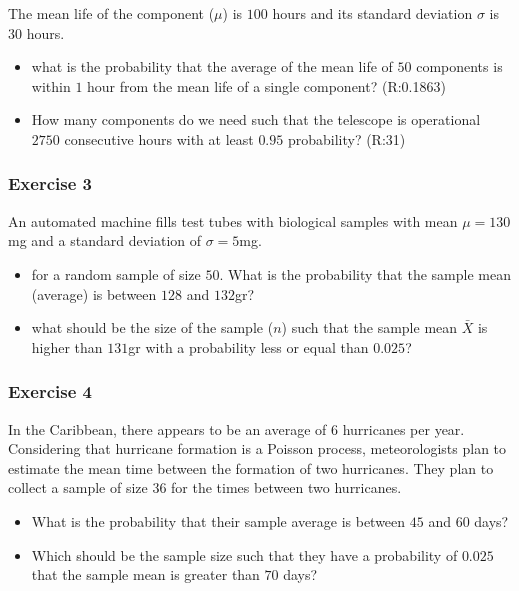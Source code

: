 \documentclass[
]{book}
\begin{document}
The mean life of the component (\(\mu\)) is \(100\) hours and its standard deviation \(\sigma\) is \(30\) hours.

\begin{itemize}
\item
  what is the probability that the average of the mean life of \(50\) components is within \(1\) hour from the mean life of a single component? (R:0.1863)
\item
  How many components do we need such that the telescope is operational \(2750\) consecutive hours with at least \(0.95\) probability? (R:31)
\end{itemize}

\hypertarget{exercise-3-3}{%
\subsubsection{Exercise 3}\label{exercise-3-3}}

An automated machine fills test tubes with biological samples with mean \(\mu=130\)mg and a standard deviation of \(\sigma=5\)mg.

\begin{itemize}
\item
  for a random sample of size \(50\). What is the probability that
  the sample mean (average) is between \(128\) and \(132\)gr?
\item
  what should be the size of the sample (\(n\)) such that the sample mean \(\bar{X}\) is higher than \(131\)gr with a probability less or equal than \(0.025\)?
\end{itemize}

\hypertarget{exercise-4-3}{%
\subsubsection{Exercise 4}\label{exercise-4-3}}

In the Caribbean, there appears to be an average of \(6\) hurricanes per year. Considering that hurricane formation is a Poisson process, meteorologists plan to estimate the mean time between the formation of two hurricanes. They plan to collect a sample of size \(36\) for the times between two hurricanes.

\begin{itemize}
\item
  What is the probability that their sample average is between \(45\) and \(60\) days?
\item
  Which should be the sample size such that they have a probability of \(0.025\) that the sample mean is greater than \(70\) days?
\end{itemize}
\end{document}

